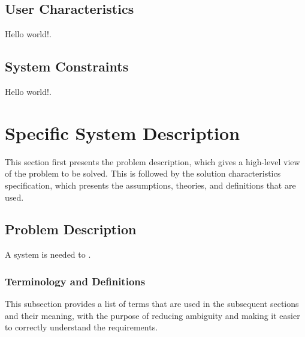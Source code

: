 \documentclass[12pt]{article}
\begin{document}
\subsection{User Characteristics}
\label{Sec:UserChars}
Hello world!.

\subsection{System Constraints}
\label{Sec:SysConstraints}
Hello world!.

\section{Specific System Description}
\label{Sec:SpecSystDesc}
This section first presents the problem description, which gives a high-level view of the problem to be solved. This is followed by the solution characteristics specification, which presents the assumptions, theories, and definitions that are used.

\subsection{Problem Description}
\label{Sec:ProbDesc}
A system is needed to .

\subsubsection{Terminology and Definitions}
\label{Sec:TermDefs}
This subsection provides a list of terms that are used in the subsequent sections and their meaning, with the purpose of reducing ambiguity and making it easier to correctly understand the requirements.
\end{document}

